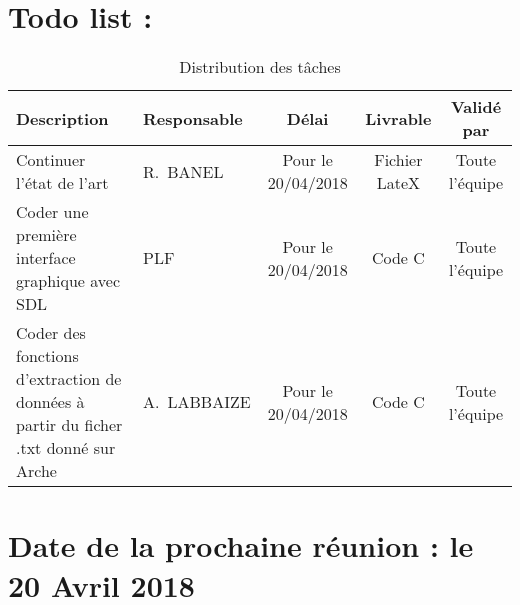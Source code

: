 \documentclass[11pt]{meetingmins}
\begin{document}
\section{Todo list :}
\begin{table}[h]
    \centering
    \begin{tabular}{|p{4cm}|p{3cm}|c|c|c|}
    \hline
        \rowcolor{yellow} Description  & Responsable & Délai & Livrable & Validé par 
        \tabularnewline \hline
        
        Continuer l'état de l'art & R.~BANEL & Pour le 20/04/2018 & Fichier LateX & Toute l'équipe \tabularnewline \hline
        
        Coder une première interface graphique avec SDL & PLF & Pour le 20/04/2018 & Code C & Toute l'équipe
        \tabularnewline \hline 
        
        Coder des fonctions d'extraction de données à partir du ficher .txt donné sur Arche  & A.~LABBAIZE & Pour le 20/04/2018 & Code C & Toute l'équipe \tabularnewline \hline
        
        
        
    \end{tabular}
    \caption{Distribution des tâches}
    \label{tab:my_label}
\end{table}

\section{Date de la prochaine réunion : \textnormal{le 20 Avril 2018} }
\end{document}
